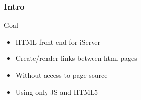 \begin{frame}
\frametitle{Intro}
	\begin{block}{Goal}
		\begin{itemize}
			\item HTML front end for iServer
			\item Create/render links between html pages
			\item Without access to page source
			\item Using only JS and HTML5
		\end{itemize}
	\end{block}
\end{frame}
